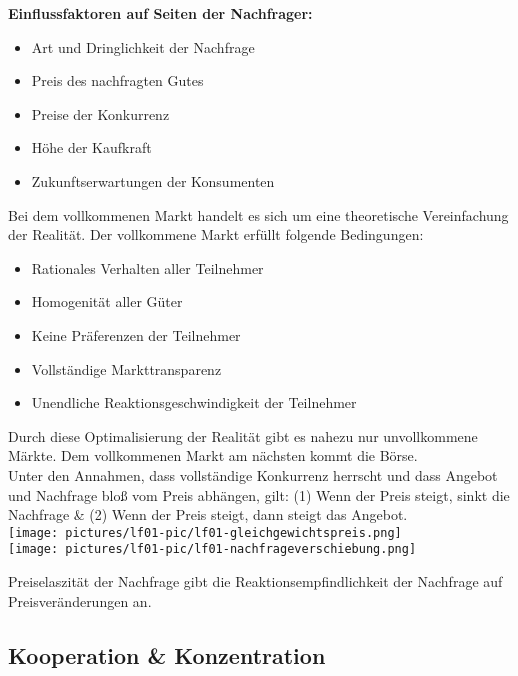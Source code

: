 {\bf Einflussfaktoren auf Seiten der Nachfrager: }
\begin{itemize}
	\item Art und Dringlichkeit der Nachfrage
	\item Preis des nachfragten Gutes
	\item Preise der Konkurrenz
	\item Höhe der Kaufkraft
	\item Zukunftserwartungen der Konsumenten
\end{itemize}

Bei dem vollkommenen Markt handelt es sich um eine theoretische Vereinfachung der Realität. Der vollkommene Markt erfüllt folgende Bedingungen:

\begin{itemize}
	\item Rationales Verhalten aller Teilnehmer
	\item Homogenität aller Güter
	\item Keine Präferenzen der Teilnehmer
	\item Vollständige Markttransparenz
	\item Unendliche Reaktionsgeschwindigkeit der Teilnehmer
\end{itemize}

Durch diese Optimalisierung der Realität gibt es nahezu nur unvollkommene Märkte. Dem vollkommenen Markt am nächsten kommt die Börse. \\

Unter den Annahmen, dass vollständige Konkurrenz herrscht und dass Angebot und Nachfrage bloß vom Preis abhängen, gilt: (1) Wenn der Preis steigt, sinkt die Nachfrage \& (2) Wenn der Preis steigt, dann steigt das Angebot.\\

\texttt{[image: pictures/lf01-pic/lf01-gleichgewichtspreis.png]}\\
\texttt{[image: pictures/lf01-pic/lf01-nachfrageverschiebung.png]}

\noindent Preiselaszität der Nachfrage gibt die Reaktionsempfindlichkeit der Nachfrage auf Preisveränderungen an.


\subsection{Kooperation \& Konzentration}

